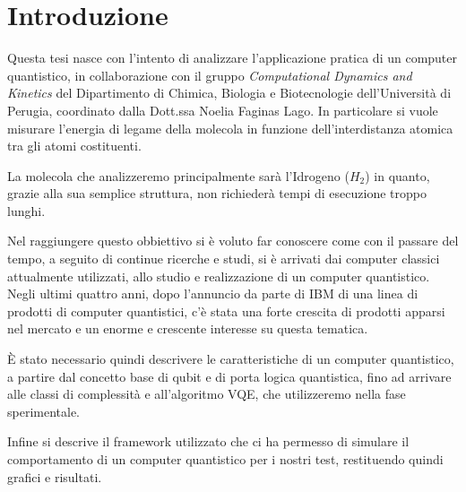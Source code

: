 \chapter*{Introduzione}

Questa tesi nasce con l'intento di analizzare l'applicazione pratica di un computer quantistico, in collaborazione con il gruppo \textit{Computational Dynamics and Kinetics} del Dipartimento di Chimica, Biologia e Biotecnologie dell'Università di Perugia, coordinato dalla Dott.ssa Noelia Faginas Lago.  In particolare si vuole misurare l'energia di legame della molecola in funzione dell'interdistanza atomica tra gli atomi costituenti.

La molecola che analizzeremo principalmente sarà l'Idrogeno ($H_2$) in quanto, grazie alla sua semplice struttura, non richiederà tempi di esecuzione troppo lunghi.

Nel raggiungere questo obbiettivo si è voluto far conoscere come con il passare del tempo, a seguito di continue ricerche e studi, si è arrivati dai computer classici attualmente utilizzati, allo studio e realizzazione di un computer quantistico. Negli ultimi quattro anni, dopo l'annuncio da parte di IBM di una linea di prodotti di computer quantistici, c'è stata una forte crescita di prodotti apparsi nel mercato e un enorme e crescente interesse su questa tematica.

È stato necessario quindi descrivere le caratteristiche di un computer quantistico, a partire dal concetto base di qubit e di porta logica quantistica, fino ad arrivare alle classi di complessità e all'algoritmo VQE, che utilizzeremo nella fase sperimentale.

Infine si descrive il framework utilizzato che ci ha permesso di simulare il comportamento di un computer quantistico per i nostri test, restituendo quindi grafici e risultati.